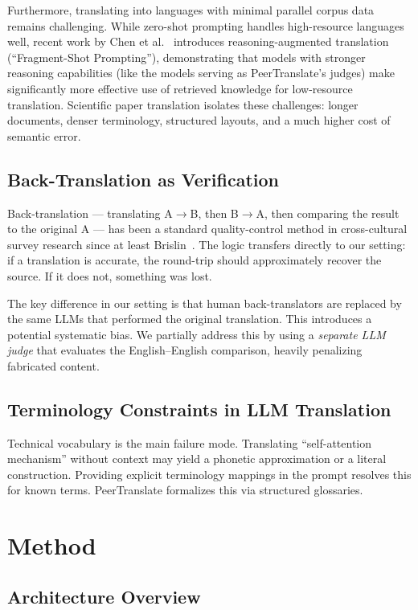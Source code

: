 \documentclass{article}
\begin{document}
Furthermore, translating into languages with minimal parallel corpus data remains challenging. While zero-shot prompting handles high-resource languages well, recent work by Chen et al.~\cite{chen2025compensating} introduces reasoning-augmented translation (``Fragment-Shot Prompting''), demonstrating that models with stronger reasoning capabilities (like the models serving as PeerTranslate's judges) make significantly more effective use of retrieved knowledge for low-resource translation. Scientific paper translation isolates these challenges: longer documents, denser terminology, structured layouts, and a much higher cost of semantic error.

\subsection{Back-Translation as Verification}

Back-translation --- translating A$\rightarrow$B, then B$\rightarrow$A, then comparing the result to the original A --- has been a standard quality-control method in cross-cultural survey research since at least Brislin~\cite{brislin1970back}. The logic transfers directly to our setting: if a translation is accurate, the round-trip should approximately recover the source. If it does not, something was lost.

The key difference in our setting is that human back-translators are replaced by the same LLMs that performed the original translation. This introduces a potential systematic bias. We partially address this by using a \emph{separate LLM judge} that evaluates the English--English comparison, heavily penalizing fabricated content.

\subsection{Terminology Constraints in LLM Translation}

Technical vocabulary is the main failure mode. Translating ``self-attention mechanism'' without context may yield a phonetic approximation or a literal construction. Providing explicit terminology mappings in the prompt resolves this for known terms. PeerTranslate formalizes this via structured glossaries.

\section{Method}

\subsection{Architecture Overview}
\end{document}
